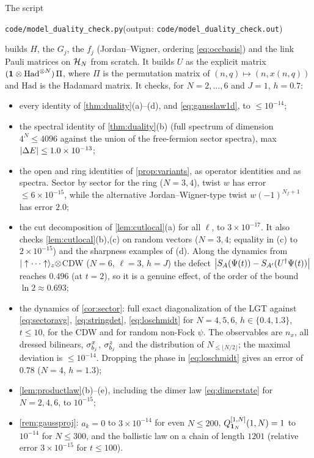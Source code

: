 \begin{remark}\label{rem:EDcheck}
The script
\begin{center}
\texttt{code/model\_duality\_check.py}\quad(output: \texttt{code/model\_duality\_check.out})
\end{center}
builds $H$, the $G_j$, the $f_j$ (Jordan--Wigner, ordering \eqref{eq:occbasis}) and the link Pauli
matrices on $\mathcal{H}_N$ from scratch.  It builds $U$ as the explicit matrix
$(\mathbf{1}\otimes\mathrm{Had}^{\otimes N})\,\Pi$, where $\Pi$ is the permutation matrix of
$(n,q)\mapsto(n,x(n,q))$ and $\mathrm{Had}$ is the Hadamard matrix.  It checks, for $N=2,\dots,6$ and
$J=1$, $h=0.7$:
\begin{itemize}
\item every identity of \cref{thm:duality}(a)--(d), and \eqref{eq:gausslaw1d}, to $\le10^{-14}$;
\item the spectral identity of \cref{thm:duality}(b) (full spectrum of dimension $4^N\le4096$ against
the union of the free-fermion sector spectra), max $\left|\Delta E\right|\le1.0\times10^{-13}$;
\item the open and ring identities of \cref{prop:variants}, as operator identities and as spectra.
Sector by sector for the ring ($N=3,4$), twist $w$ has error $\le6\times10^{-15}$, while the
alternative Jordan--Wigner-type twist $w(-1)^{N_f+1}$ has error $2.0$;
\item the cut decomposition of \cref{lem:cutlocal}(a) for all $\ell$, to $3\times10^{-17}$.  It also
checks \cref{lem:cutlocal}(b),(c) on random vectors ($N=3,4$; equality in (c) to $2\times10^{-15}$)
and the sharpness examples of (d).  Along the dynamics from $|\uparrow\cdots\uparrow\rangle_z\otimes$CDW
($N=6$, $\ell=3$, $h=J$) the defect $\left|S_A(\Psi(t))-S_{A'}(U^\dagger\Psi(t))\right|$ reaches $0.496$ (at $t=2$),
so it is a genuine effect, of the order of the bound $\ln2\approx0.693$;
\item the dynamics of \cref{cor:sector}: full exact diagonalization of the LGT against
\eqref{eq:sectoravg}, \eqref{eq:stringdet}, \eqref{eq:loschmidt} for $N=4,5,6$, $h\in\{0.4,1.3\}$,
$t\le10$, for the CDW and for random non-Fock $\psi$.  The observables are $n_x$, all dressed
bilinears, $\sigma^{x}_{b_{j}}$, $\sigma^{z}_{b_{j}}$ and the distribution of $N_{\le\lfloor N/2\rfloor}$; the maximal
deviation is $\le10^{-14}$.  Dropping the phase in \eqref{eq:loschmidt} gives an error of $0.78$
($N=4$, $h=1.3$);
\item \cref{lem:productlaw}(b)--(e), including the dimer law \eqref{eq:dimerstate} for $N=2,4,6$, to
$10^{-15}$;
\item \cref{rem:gaussproj}: $a_k=0$ to $3\times10^{-14}$ for even $N\le200$,
$Q_{\mathbf{1}_N}^{[1,N]}(1,N)=1$ to $10^{-14}$ for $N\le300$, and the ballistic law on a chain of
length $1201$ (relative error $3\times10^{-15}$ for $t\le100$).
\end{itemize}
\end{remark}
